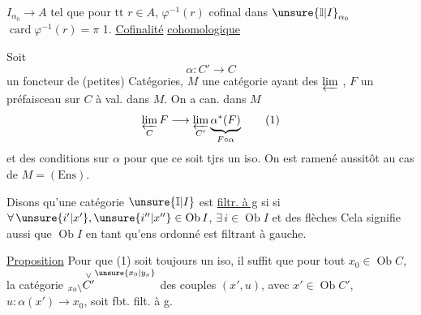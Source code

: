 $I_{\alpha_0}\longrightarrow A$ tel que pour tt  $r\in A$, $\varphi^{-1}(r)$ cofinal dans $\unsure{\mathbb I|I}_{\alpha_0}$  $\operatorname{card}\varphi^{-1}(r)=\pi$
1. \uline{Cofinalité} \uline{cohomologique}

Soit
\[
 \alpha:C'\longrightarrow C
\]
un foncteur de (petites) Catégories, $M$ une catégorie ayant des $\varprojlim$ , $F$ un préfaisceau sur $C$ à val. dans $M$. On a  can. dans $M$
\[
 \varprojlim_C F\longrightarrow\varprojlim_{C'}\underbrace{\alpha^*(F)}_{F\circ\alpha}
 \tag*{(1)}
\]
et \uline{}  des conditions sur $\alpha$ pour que ce soit tjrs un iso. On est ramené aussitôt au cas de $M=(\mathrm{Ens})$.
 

Disons qu'une catégorie $\unsure{\mathbb I|I}$ est  \uline{filtr. à g} si  si $\forall\,\unsure{i'|x'},\unsure{i''|x''}\in\operatorname{Ob}I$, $\exists\,i\in\operatorname{Ob}I$ et des flèches
Cela signifie aussi que $\operatorname{Ob}I$ en tant qu'ens ordonné est filtrant à gauche.

\uline{Proposition} Pour que (1) soit toujours un iso,  il suffit que pour tout $x_0\in\operatorname{Ob} C$, la catégorie ${}_{x_0\backslash}\overset{\vee}{C'}^{\unsure{x_0|y_x}}$ des couples $(x',u)$, avec $x'\in\operatorname{Ob}C'$, $u:\alpha(x')\longrightarrow x_0$, soit fbt. filt. à g.

